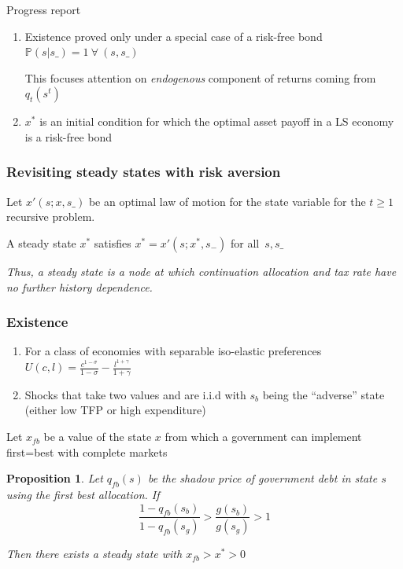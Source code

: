 \documentclass{beamer}
\newtheorem{proposition}{Proposition}
\begin{document}
\begin{frame}{Progress report}

\begin{enumerate}
 \item  Existence proved only under a special case of a risk-free bond  $\mathbb{P}(s|s\_)=1 \ \forall \ (s,s\_)$

 This focuses attention  on \textit{endogenous} component of returns coming from $q_t(s^t)$

 \item   $x^*$  is an initial condition for which the optimal asset payoff  in a LS economy is a risk-free bond

\end{enumerate}

\end{frame}

\begin{frame}
 \frametitle{Revisiting steady states with risk aversion}
Let $x'\left( s;{x},s\_\right) $ be an optimal  law of motion for the state variable
for the $t\geq1$ recursive problem.

\begin{definition}
 A steady state  ${x}^{*} $  satisfies ${ x}^{*}  =x' \left( s;{x}^{*},s_{-}\right) $ for all $%
\,s,s\_$
\end{definition}


\vspace{3mm}
\emph{Thus, a steady state is a node at which  continuation allocation and tax rate have no further history dependence. }

 \end{frame}




 \begin{frame}
	\frametitle{Existence}
	
	\begin{enumerate}
	 \item For a class of economies with separable iso-elastic preferences
	 $U(c,l) = \frac{c^{1-\sigma}}{1-\sigma} -\frac{ l^{1+\gamma}}{1+\gamma}$
	 \item Shocks that take two values and are i.i.d with $s_b$  being the ``adverse'' state (either low TFP or high expenditure)
	\end{enumerate}

	
	Let $x_{fb}$ be a value of the state $x$ from which a government can implement first=best with complete markets
	
	
	
	
	\begin{proposition}  Let $q_{fb}(s)$ be the shadow price of government debt in state $s$ using the first best allocation.
	If
	\[
		\frac{1-q_{fb}(s_b)}{1-q_{fb}(s_g)} > \frac{g(s_b)}{g(s_g)}>1
	\]
	
	Then there exists a steady state with $x_{fb}>x^*>0$
		\end{proposition}
\end{frame}
\end{document}

